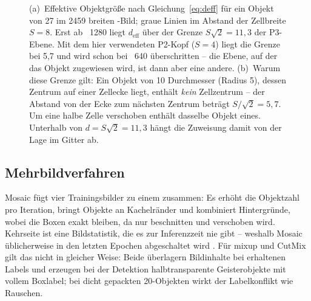 \begin{figure}[htbp]
\vspace{5mm}
\caption[Effektive Objektgröße und Zuweisungsgrenze]{(a)~Effektive Objektgröße
nach Gleichung~\eqref{eq:deff} für ein Objekt von 27\px{} im 2459\px{} breiten
-Bild; graue Linien im Abstand der Zellbreite $S = 8$\px. Erst ab
~1280 liegt $d_{\text{eff}}$ über der Grenze $S\sqrt{2} = 11{,}3$\px{}
der P3-Ebene. Mit dem hier verwendeten P2-Kopf ($S = 4$) liegt die Grenze bei
5,7\px{} und wird schon bei ~640 überschritten -- die Ebene, auf der
das Objekt zugewiesen wird, ist dann aber eine andere.
(b)~Warum diese Grenze gilt: Ein Objekt von 10\px{} Durchmesser (Radius 5\px),
dessen Zentrum auf einer Zellecke liegt, enthält \emph{kein} Zellzentrum -- der
Abstand von der Ecke zum nächsten Zentrum beträgt $S/\sqrt{2} = 5{,}7$\px. Um
eine halbe Zelle verschoben enthält dasselbe Objekt eines. Unterhalb von
$d = S\sqrt{2} = 11{,}3$\px{} hängt die Zuweisung damit von der Lage im Gitter
ab.}
\label{abb:aufloesung}
\end{figure}

\subsection{Mehrbildverfahren}

Mosaic \parencite{bochkovskiy2020} fügt vier Trainingsbilder zu einem zusammen:
Es erhöht die Objektzahl pro Iteration, bringt Objekte an Kachelränder und
kombiniert Hintergründe, wobei die Boxen exakt bleiben, da nur beschnitten und
verschoben wird. Kehrseite ist eine Bildstatistik, die es zur Inferenzzeit nie
gibt -- weshalb Mosaic üblicherweise in den letzten Epochen abgeschaltet wird
\parencite{ultralyticsdocs}. Für mixup und CutMix gilt das nicht in gleicher
Weise: Beide überlagern Bildinhalte bei erhaltenen Labels und erzeugen bei der
Detektion halbtransparente Geisterobjekte mit vollem Boxlabel; bei dicht
gepackten 20\px-Objekten wirkt der Labelkonflikt wie Rauschen.


